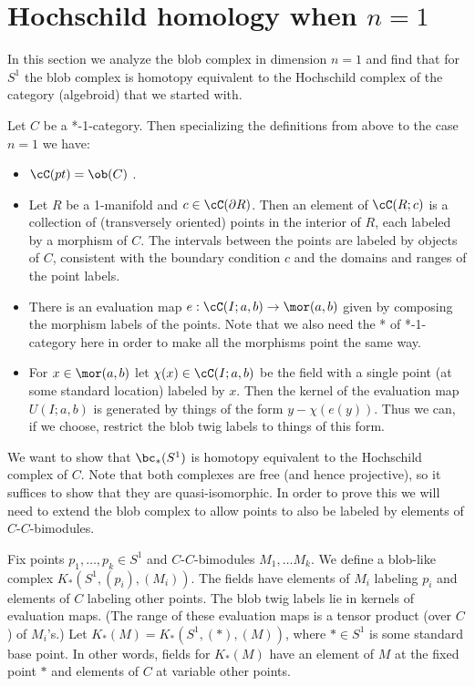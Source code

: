 
\section{Hochschild homology when $n=1$}
\label{sec:hochschild}

In this section we analyze the blob complex in dimension $n=1$
and find that for $S^1$ the blob complex is homotopy equivalent to the 
Hochschild complex of the category (algebroid) that we started with.



Let $C$ be a *-1-category.
Then specializing the definitions from above to the case $n=1$ we have:
\begin{itemize}
\item $\cC(pt) = \ob(C)$ .
\item Let $R$ be a 1-manifold and $c \in \cC(\bd R)$.
Then an element of $\cC(R; c)$ is a collection of (transversely oriented)
points in the interior
of $R$, each labeled by a morphism of $C$.
The intervals between the points are labeled by objects of $C$, consistent with
the boundary condition $c$ and the domains and ranges of the point labels.
\item There is an evaluation map $e: \cC(I; a, b) \to \mor(a, b)$ given by
composing the morphism labels of the points.
Note that we also need the * of *-1-category here in order to make all the morphisms point
the same way.
\item For $x \in \mor(a, b)$ let $\chi(x) \in \cC(I; a, b)$ be the field with a single
point (at some standard location) labeled by $x$.
Then the kernel of the evaluation map $U(I; a, b)$ is generated by things of the
form $y - \chi(e(y))$.
Thus we can, if we choose, restrict the blob twig labels to things of this form.
\end{itemize}

We want to show that $\bc_*(S^1)$ is homotopy equivalent to the
Hochschild complex of $C$.
Note that both complexes are free (and hence projective), so it suffices to show that they
are quasi-isomorphic.
In order to prove this we will need to extend the blob complex to allow points to also
be labeled by elements of $C$-$C$-bimodules.

Fix points $p_1, \ldots, p_k \in S^1$ and $C$-$C$-bimodules $M_1, \ldots M_k$.
We define a blob-like complex $K_*(S^1, (p_i), (M_i))$.
The fields have elements of $M_i$ labeling $p_i$ and elements of $C$ labeling
other points.
The blob twig labels lie in kernels of evaluation maps.
(The range of these evaluation maps is a tensor product (over $C$) of $M_i$'s.)
Let $K_*(M) = K_*(S^1, (*), (M))$, where $* \in S^1$ is some standard base point.
In other words, fields for $K_*(M)$ have an element of $M$ at the fixed point $*$
and elements of $C$ at variable other points.


